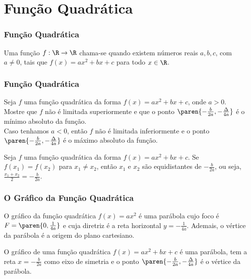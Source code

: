 \documentclass[10pt]{beamer}
\begin{document}
\section{Função Quadrática}
\begin{frame}
\frametitle{Função Quadrática} 

\begin{definicao}
Uma função $f: \R \to \R$ chama-se  quando existem
números reais $a, b, c$, com $a \neq 0$, tais que $f(x) = ax^2 +bx
+c$ para todo $x \in \R$.
\end{definicao}


\end{frame}


\begin{frame}
\frametitle{Função Quadrática} 

\begin{proposicao}
Seja $f$ uma função quadrática da forma $f(x) = ax^2 + bx +c$, onde
$a >0$.\\
Mostre que $f$ não é limitada superiormente e que o ponto
$\paren{-\frac {b} {2a}, -\frac {\Delta} {4a}}$ é o mínimo absoluto
da função.\\
Caso tenhamos $a<0$, então $f$ não é limitada inferiormente e  o
ponto $\paren{-\frac {b} {2a}, -\frac {\Delta} {4a}}$ é o máximo
absoluto da função.
\end{proposicao}\pause

\begin{proposicao}
Seja $f$ uma função quadrática da forma $f(x) = ax^2 + bx +c$. Se
$f(x_1) = f(x_2)$ para $x_1 \neq x_2$, então $x_1$ e $x_2$ são
equidistantes de $-\frac{b} {2a}$, ou seja, $\frac{x_1 +x_2} 2 =
-\frac{b}{2a}$.
\end{proposicao}

\end{frame}


\begin{frame}
\frametitle{O Gráfico da Função Quadrática} 

\begin{exemplo}
O gráfico da função quadrática $f(x) = ax^2$ é uma parábola cujo
foco é $F = \paren{0, \frac 1 {4a}}$ e cuja diretriz é a reta
horizontal $y = -\frac{1}{4a}$. Ademais, o vértice da parábola é a
origem do plano cartesiano.
\end{exemplo}\pause

\begin{proposicao}
O gráfico de uma função quadrática $f(x) = ax^2 + bx + c$ é uma
parábola, tem a reta $x = -\frac {b}{2a}$ como eixo de simetria e o
ponto $\paren{-\frac {b} {2a}, -\frac {\Delta} {4a}}$ é o vértice da
parábola.
\end{proposicao}

\end{frame}
\end{document}
